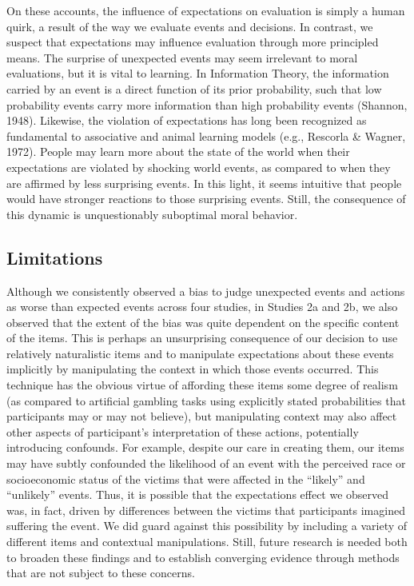 \documentclass[10pt, letterpaper]{article}
\begin{document}
On these accounts, the influence of expectations on evaluation is simply
a human quirk, a result of the way we evaluate events and decisions. In
contrast, we suspect that expectations may influence evaluation through
more principled means. The surprise of unexpected events may seem
irrelevant to moral evaluations, but it is vital to learning. In
Information Theory, the information carried by an event is a direct
function of its prior probability, such that low probability events
carry more information than high probability events (Shannon, 1948).
Likewise, the violation of expectations has long been recognized as
fundamental to associative and animal learning models (e.g., Rescorla \&
Wagner, 1972). People may learn more about the state of the world when
their expectations are violated by shocking world events, as compared to
when they are affirmed by less surprising events. In this light, it
seems intuitive that people would have stronger reactions to those
surprising events. Still, the consequence of this dynamic is
unquestionably suboptimal moral behavior.

\subsection{Limitations}\label{limitations}

Although we consistently observed a bias to judge unexpected events and
actions as worse than expected events across four studies, in Studies 2a
and 2b, we also observed that the extent of the bias was quite dependent
on the specific content of the items. This is perhaps an unsurprising
consequence of our decision to use relatively naturalistic items and to
manipulate expectations about these events implicitly by manipulating
the context in which those events occurred. This technique has the
obvious virtue of affording these items some degree of realism (as
compared to artificial gambling tasks using explicitly stated
probabilities that participants may or may not believe), but
manipulating context may also affect other aspects of participant's
interpretation of these actions, potentially introducing confounds. For
example, despite our care in creating them, our items may have subtly
confounded the likelihood of an event with the perceived race or
socioeconomic status of the victims that were affected in the ``likely''
and ``unlikely'' events. Thus, it is possible that the expectations
effect we observed was, in fact, driven by differences between the
victims that participants imagined suffering the event. We did guard
against this possibility by including a variety of different items and
contextual manipulations. Still, future research is needed both to
broaden these findings and to establish converging evidence through
methods that are not subject to these concerns.
\end{document}
